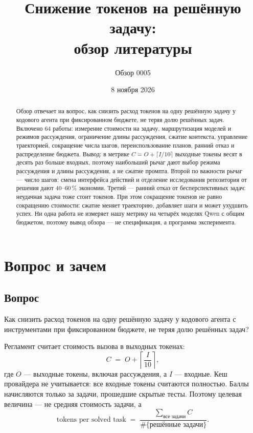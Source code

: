 \documentclass[11pt,a4paper]{article}
\title{Снижение токенов на решённую задачу:\\
обзор литературы}
\author{Обзор 0005}
\date{8 ноября 2026}
\begin{document}
\maketitle

\begin{abstract}
\noindent
Обзор отвечает на вопрос, как снизить расход токенов на одну решённую задачу
у кодового агента при фиксированном бюджете, не теряя долю решённых задач.
Включено 64 работы: измерение стоимости на задачу, маршрутизация моделей и
режимов рассуждения, ограничение длины рассуждения, сжатие контекста,
управление траекторией, сокращение числа шагов, переиспользование планов,
ранний отказ и распределение бюджета. Вывод: в метрике
$C=O+\lceil I/10\rceil$ выходные токены весят в десять раз больше входных,
поэтому наибольший рычаг дают выбор режима рассуждения и длины рассуждения,
а не сжатие промпта. Второй по важности рычаг — число шагов: смена интерфейса
действий и отделение исследования репозитория от решения дают 40--60\,\%
экономии. Третий — ранний отказ от бесперспективных задач: неудачная задача
тоже стоит токенов. При этом сокращение токенов не равно сокращению
стоимости: сжатие меняет траекторию, добавляет шаги и может ухудшить успех.
Ни одна работа не измеряет нашу метрику на четырёх моделях Qwen с общим
бюджетом, поэтому вывод обзора — не спецификация, а программа
эксперимента.
\end{abstract}

\section{Вопрос и зачем}

\subsection{Вопрос}

Как снизить расход токенов на одну решённую задачу у кодового агента с
инструментами при фиксированном бюджете, не теряя долю решённых задач?

Регламент считает стоимость вызова в выходных токенах:
\begin{equation}
  C \;=\; O + \left\lceil \frac{I}{10} \right\rceil ,
  \label{eq:cost}
\end{equation}
где $O$ — выходные токены, включая рассуждения, а $I$ — входные. Кеш
провайдера не учитывается: все входные токены считаются полностью. Баллы
начисляются только за задачи, прошедшие скрытые тесты. Поэтому целевая
величина — не средняя стоимость задачи, а
\begin{equation}
  \text{tokens per solved task}
  \;=\; \frac{\sum_{\text{все задачи}} C}{\#\{\text{решённые задачи}\}} .
  \label{eq:metric}
\end{equation}
\end{document}
